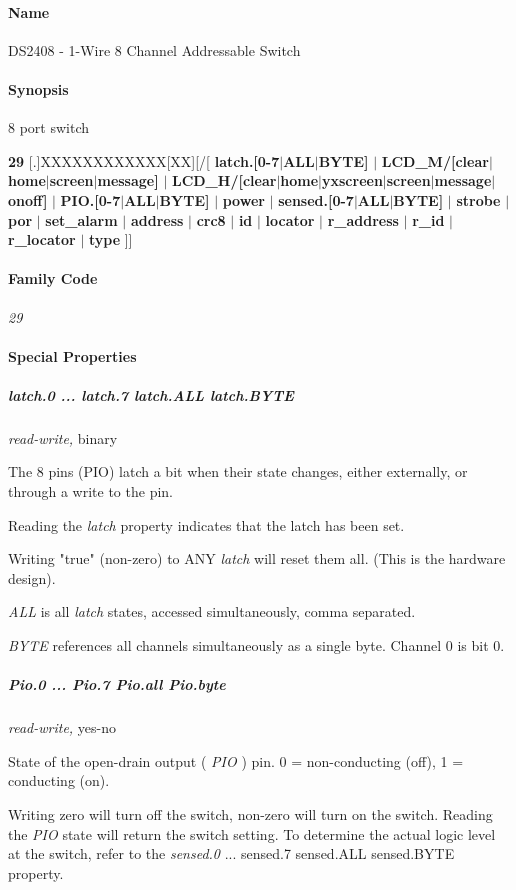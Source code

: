 \paragraph*{Name}
DS2408 - 1-Wire 8 Channel Addressable Switch 
\paragraph*{Synopsis}
8 port
switch 

\textbf{29} [.]XXXXXXXXXXXX[XX][/[ \textbf{latch.[0-7$|$ALL$|$BYTE]} $|$ \textbf{LCD\_M/[clear$|$home$|$screen$|$message]}
$|$ \textbf{LCD\_H/[clear$|$home$|$yxscreen$|$screen$|$message$|$onoff]} $|$ \textbf{PIO.[0-7$|$ALL$|$BYTE]} $|$ \textbf{power} $|$ \textbf{sensed.[0-7$|$ALL$|$BYTE]}
$|$ \textbf{strobe} $|$ \textbf{por} $|$ \textbf{set\_alarm} $|$           \textbf{address} $|$ \textbf{crc8} $|$ \textbf{id} $|$ \textbf{locator} $|$ \textbf{r\_address}
$|$ \textbf{r\_id} $|$ \textbf{r\_locator} $|$ \textbf{type}  ]] 
\paragraph*{Family Code}


\textit{29} 
\paragraph*{Special Properties}

\subparagraph*{latch.0 ... latch.7
latch.ALL latch.BYTE}\textit{read-write,} binary 

The 8 pins (PIO) latch a bit when their state changes, either externally,
or through a write to the pin.  

Reading the \textit{latch} property indicates that the latch has been set. 

Writing "true" (non-zero) to ANY  \textit{latch}  will reset them all. (This is the
hardware design). 

\textit{ALL} is all  \textit{latch}  states, accessed simultaneously, comma separated. 

\textit{BYTE} references all channels simultaneously as a single byte. Channel 0
is bit 0. 
\subparagraph*{Pio.0 ...  Pio.7 Pio.all Pio.byte}\textit{read-write,} yes-no 

State of the open-drain output ( \textit{PIO} ) pin. 0 = non-conducting (off), 1 =
\textsf{conducting (on)}. 

Writing zero will turn off the switch, non-zero will turn on the switch.
Reading the \textit{PIO} state will return the switch setting. To determine the actual
logic level at the switch, refer to the \textit{sensed.0} ... sensed.7 sensed.ALL sensed.BYTE
property. 

